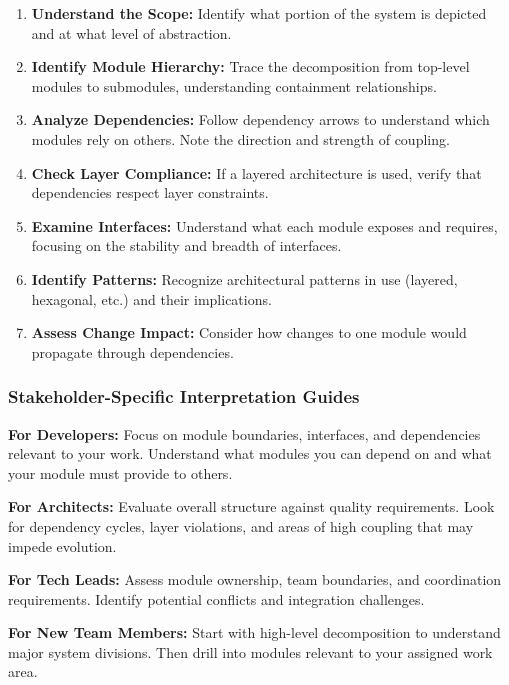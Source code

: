 \documentclass[11pt,letterpaper]{article}
\begin{document}
\begin{enumerate}
    \item \textbf{Understand the Scope:} Identify what portion of the system is depicted and at what level of abstraction.
    
    \item \textbf{Identify Module Hierarchy:} Trace the decomposition from top-level modules to submodules, understanding containment relationships.
    
    \item \textbf{Analyze Dependencies:} Follow dependency arrows to understand which modules rely on others. Note the direction and strength of coupling.
    
    \item \textbf{Check Layer Compliance:} If a layered architecture is used, verify that dependencies respect layer constraints.
    
    \item \textbf{Examine Interfaces:} Understand what each module exposes and requires, focusing on the stability and breadth of interfaces.
    
    \item \textbf{Identify Patterns:} Recognize architectural patterns in use (layered, hexagonal, etc.) and their implications.
    
    \item \textbf{Assess Change Impact:} Consider how changes to one module would propagate through dependencies.
\end{enumerate}

\subsubsection{Stakeholder-Specific Interpretation Guides}

\textbf{For Developers:}
Focus on module boundaries, interfaces, and dependencies relevant to your work. Understand what modules you can depend on and what your module must provide to others.

\textbf{For Architects:}
Evaluate overall structure against quality requirements. Look for dependency cycles, layer violations, and areas of high coupling that may impede evolution.

\textbf{For Tech Leads:}
Assess module ownership, team boundaries, and coordination requirements. Identify potential conflicts and integration challenges.

\textbf{For New Team Members:}
Start with high-level decomposition to understand major system divisions. Then drill into modules relevant to your assigned work area.
\end{document}
